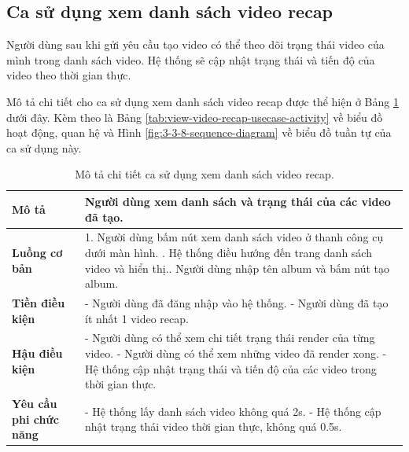 \subsection{Ca sử dụng xem danh sách video recap}

Người dùng sau khi gửi yêu cầu tạo video có thể theo dõi trạng thái video của mình trong danh sách video. Hệ thống sẽ cập nhật trạng thái và tiến độ của video theo thời gian thực.  

Mô tả chi tiết cho ca sử dụng xem danh sách video recap được thể hiện ở Bảng \ref{tab:view-video-recap-usecase} dưới đây. Kèm theo là Bảng \ref{tab:view-video-recap-usecase-activity} về biểu đồ hoạt động, quan hệ và Hình \ref{fig:3-3-8-sequence-diagram} về biểu đồ tuần tự của ca sử dụng này. 

\noindent 

\begin{table}[H]
\centering
\begin{tabularx}{\linewidth}{| l | X |} 
\hline 
\textbf{Mô tả} & Người dùng xem danh sách và trạng thái của các video đã tạo. \\
\hline 
\textbf{Luồng cơ bản} & 1. Người dùng bấm nút xem danh sách video ở thanh công cụ dưới màn hình. \newline
                       2. Hệ thống điều hướng đến trang danh sách video và hiển thị.\newline
                       3. Người dùng nhập tên album và bấm nút tạo album. \\
\hline 
\textbf{Tiền điều kiện} & - Người dùng đã đăng nhập vào hệ thống. \newline
                            - Người dùng đã tạo ít nhất 1 video recap. \\
\textbf{Hậu điều kiện} & - Người dùng có thể xem chi tiết trạng thái render của từng video. \newline
                        - Người dùng có thể xem những video đã render xong. \newline
                        - Hệ thống cập nhật trạng thái và tiến độ của các video trong thời gian thực. \\
\hline 
\textbf{Yêu cầu phi chức năng} & - Hệ thống lấy danh sách video không quá 2s. \newline
                        - Hệ thống cập nhật trạng thái video thời gian thực, không quá 0.5s. \\   
\hline 
\end{tabularx}
\caption{Mô tả chi tiết ca sử dụng xem danh sách video recap.}
\label{tab:view-video-recap-usecase}
\end{table}

